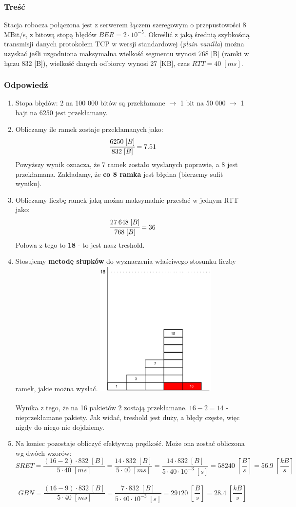 \documentclass[a4paper,twoside]{article}
\begin{document}
\subsubsection{Treść}
Stacja robocza połączona jest z serwerem łączem szeregowym o przepustowości 8 MBit/s, z bitową stopą błędów $ BER=2\cdot 10^{-5} $. Określić z jaką średnią szybkością transmisji danych protokołem TCP w wersji standardowej (\emph{plain vanilla}) można uzyskać jeśli uzgodniona maksymalna wielkość segmentu wynosi 768 [B] (ramki w łączu 832 [B]), wielkość danych odbiorcy wynosi 27 [KB], czas $ RTT=40\;[ms] $.
\subsubsection{Odpowiedź}
\begin{enumerate}
	\item Stopa błędów: 2 na 100 000 bitów są przekłamane $ \rightarrow $ 1 bit na 50 000 $ \rightarrow $ 1 bajt na 6250 jest przekłamany.
	\item Obliczamy ile ramek zostaje przekłamanych jako:
	$$ \cfrac{6250\;[B]}{832\;[B]}=7.51 $$
	Powyższy wynik oznacza, że 7 ramek zostało wysłanych poprawie, a 8 jest przekłamana. Zakładamy, że \textbf{co 8 ramka} jest błędna (bierzemy sufit wyniku).
	\item Obliczamy liczbę ramek jaką można maksymalnie przesłać w jednym RTT jako:
	$$ \cfrac{27\:648\;[B]}{768\;[B]}=36 $$
	Połowa z tego to \textbf{18} - to jest nasz treshold.
	\item Stosujemy \textbf{metodę słupków} do wyznaczenia właściwego stosunku liczby ramek, jakie można wysłać.
	\includegraphics[width=6.0cm]{./images/zadanie07.pdf}\\\\
	Wynika z tego, że na 16 pakietów 2 zostają przekłamane. $ 16 - 2 = 14 $ - nieprzekłamane pakiety. Jak widać, treshold jest duży, a błędy częste, więc nigdy do niego nie dojdziemy.
	\item Na koniec pozostaje obliczyć efektywną prędkość. Może ona zostać obliczona wg dwóch wzorów:
	$$ SRET=\frac{(16-2)\cdot 832\;[B]}{5\cdot 40\;[ms]}=\frac{14\cdot 832\;[B]}{5\cdot 40\;[ms]}=\frac{14\cdot 832\;[B]}{5\cdot 40\cdot 10^{-3}\;[s]}=58240\;[\frac{B}{s}]=56.9\; [\frac{kB}{s}]$$\\
	$$ GBN=\frac{(16-9)\cdot 832\;[B]}{5\cdot 40\;[ms]}=\frac{7\cdot 832\;[B]}{5\cdot 40\cdot 10^{-3}\;[s]}=29120\;[\frac{B}{s}]=28.4\;[\frac{kB}{s}] $$
\end{enumerate}
\newpage
\end{document}

